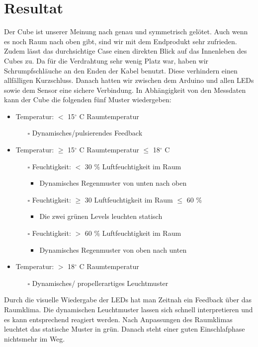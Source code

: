 \documentclass{article}
\begin{document}
\section{Resultat}
\label{section:result}
Der Cube ist unserer Meinung nach genau und symmetrisch gelötet. Auch wenn es noch Raum nach oben gibt, sind wir mit dem Endprodukt sehr zufrieden. Zudem lässt das durchsichtige Case einen direkten Blick auf das Innenleben des Cubes zu. Da für die Verdrahtung sehr wenig Platz war, haben wir Schrumpfschläuche an den Enden
der Kabel benutzt. Diese verhindern einen allfälligen Kurzschluss. Danach hatten wir zwischen dem Arduino und allen LEDs sowie dem Sensor eine sichere Verbindung. In Abhängigkeit von den Messdaten kann der Cube die folgenden fünf Muster wiedergeben:

\begin{itemize}
\item Temperatur: $<$ 15$^\circ$ C Raumtemperatur
\begin{itemize}
\item[$\square$] Dynamisches/pulsierendes Feedback
\end{itemize}
\item Temperatur: $\geq$ 15$^\circ$ C Raumtemperatur $\leq$ 18$^\circ$ C
\begin{itemize}
\item[$\square$] Feuchtigkeit: $<$ 30 \% Luftfeuchtigkeit im Raum
\begin{itemize}[label=$\ast$]
\item Dynamisches Regenmuster von unten nach oben 
\end{itemize}
\end{itemize}
\begin{itemize}
\item[$\square$] Feuchtigkeit: $\geq$ 30 Luftfeuchtigkeit im Raum $ \leq$ 60  \%
\begin{itemize}[label=$\ast$]
\item Die zwei grünen Levels leuchten statisch
\end{itemize}
\end{itemize}
\begin{itemize}
\item[$\square$] Feuchtigkeit: $>$ 60 \% Luftfeuchtigkeit im Raum
\begin{itemize}[label=$\ast$]
\item Dynamisches Regenmuster von oben nach unten
\end{itemize}
\end{itemize}
\item Temperatur: $> $ 18$^\circ$ C Raumtemperatur
\begin{itemize}
\item[$\square$] Dynamisches/ propellerartiges Leuchtmuster
\end{itemize}
\end{itemize}
Durch die visuelle Wiedergabe der LEDs hat man Zeitnah ein Feedback über das Raumklima. Die dynamischen Leuchtmuster lassen sich schnell interpretieren und es kann entsprechend reagiert werden. Nach Anpassungen des Raumklimas leuchtet das statische Muster in grün. Danach steht einer guten Einschlafphase \glqq nichts\grqq \text{ }mehr im Weg.
\end{document}
